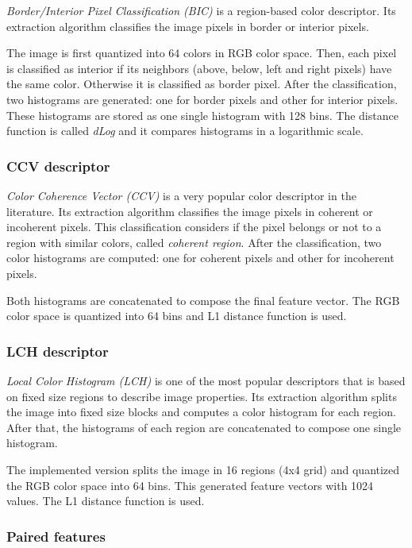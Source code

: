 \emph{Border/Interior Pixel Classification (BIC)} \cite{stehling2002compact} is a region-based color descriptor. Its extraction algorithm classifies the image pixels in border or interior
pixels. 

The image is first quantized into 64 colors in RGB color space. Then, each pixel is classified as interior
if its neighbors (above, below, left and right pixels) have the same color. Otherwise it is classified as border pixel. After the classification, two histograms are generated: one for border pixels and other for interior pixels. These histograms are stored as one single histogram with 128 bins. The distance
function is called \emph{dLog} and it compares histograms in a logarithmic scale. 

\subsubsection{CCV descriptor}

\emph{Color Coherence Vector (CCV)} \cite{pass1997comparing} is a very popular color descriptor in the literature. Its extraction algorithm classifies the image pixels in coherent or incoherent pixels. This classification considers if the pixel belongs or not to a region with similar colors, called \emph{coherent region}. After the classification, two color histograms are computed: one for coherent pixels and other for incoherent pixels.

Both histograms are concatenated to compose the final feature vector. The RGB color space is quantized into 64 bins and L1 distance function is used.

\subsubsection{LCH descriptor}

\emph{Local Color Histogram (LCH)} \cite{swain1991color} is one of the most popular descriptors that is based on fixed size regions to describe image properties. Its extraction algorithm splits the image into fixed size blocks and computes a color histogram for each region. After that, the histograms of each region
are concatenated to compose one single histogram. 

The implemented version splits the image
in 16 regions (4x4 grid) and quantized the RGB color space into 64 bins. This generated feature vectors with 1024 values. The L1 distance function is used.


\subsubsection{Paired features}

